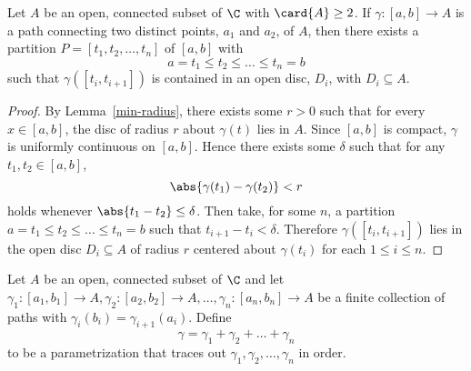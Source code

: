 \documentclass[12pt]{amsart}
\begin{document}
\begin{lem}\label{partition}
  Let $A$ be an open, connected subset of $\C$ with $\card{A} \geq 2$.
  If $\gamma \colon [a, b] \rightarrow A$ is a path connecting two distinct points, $a_1$ and $a_2$, of $A$, then there exists a partition $P = [t_1, t_2, \ldots, t_n]$ of $[a,b]$ with
  $$a = t_1 \leq t_2 \leq \ldots \leq t_n = b$$
  such that $\gamma([t_i, t_{i+1}])$ is contained in an open disc, $D_i$, with $D_i \subseteq A$.
  \begin{proof}
    By Lemma~\ref{min-radius}, there exists some $r > 0$ such that for every $x \in [a,b]$, the disc of radius $r$ about $\gamma(t)$ lies in $A$.
    Since $[a,b]$ is compact, $\gamma$ is uniformly continuous on $[a,b]$.
    Hence there exists some $\delta$ such that for any $t_1, t_2 \in [a,b]$, $$\abs{\gamma(t_1) - \gamma(t_2)} < r$$ holds whenever $\abs{t_1 - t_2} \leq \delta$.
    Then take, for some $n$, a partition $a = t_1 \leq t_2 \leq \ldots \leq t_n = b$ such that $t_{i+1} - t_i < \delta$.
    Therefore $\gamma([t_i, t_{i+1}])$ lies in the open disc $D_i \subseteq A$ of radius $r$ centered about $\gamma(t_i)$ for each $1 \leq i \leq n$.
  \end{proof}
\end{lem}

\begin{defn}
  Let $A$ be an open, connected subset of $\C$ and let $\gamma_1 \colon [a_1,b_1] \rightarrow A, \gamma_2 \colon [a_2,b_2] \rightarrow A, \ldots, \gamma_n \colon [a_n,b_n] \rightarrow A$ be a finite collection of paths with $\gamma_i(b_i) = \gamma_{i+1}(a_i)$.
  Define $$\gamma = \gamma_1 + \gamma_2 + \ldots + \gamma_n$$ to be a parametrization that traces out $\gamma_1, \gamma_2, \ldots, \gamma_n$ in order.
\end{defn}
\end{document}
